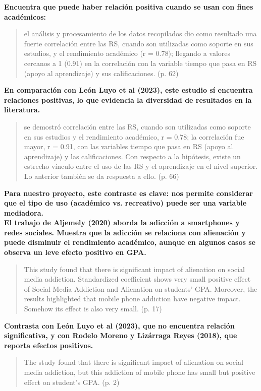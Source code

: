 \documentclass[12pt]{article}
\begin{document}
\textbf{Encuentra que puede haber relación positiva cuando se usan con fines académicos:}
\begin{quote}
     el análisis y procesamiento de los datos recopilados dio como resultado una fuerte 
    correlación entre las RS, cuando son utilizadas como soporte en sus estudios, y el rendimiento académico (r = 0.78); llegando 
    a valores cercanos a 1 (0.91) en la correlación con la variable tiempo que pasa en RS (apoyo al aprendizaje) y sus 
    calificaciones. (p. 62)
\end{quote}

\textbf{En comparación con León Luyo et al (2023), este estudio sí encuentra relaciones positivas, lo que evidencia la diversidad de resultados en la literatura.}
\begin{quote}
    se demostró correlación entre las RS, 
    cuando son utilizadas como soporte en sus estudios y el 
    rendimiento académico, r = 0.78; la correlación fue mayor, 
    r = 0.91, con las variables tiempo que pasa en RS (apoyo 
    al aprendizaje) y las calificaciones. Con respecto a la 
    hipótesis, existe un estrecho vínculo entre el uso de las RS 
    y el aprendizaje en el nivel superior. Lo anterior también 
    se da respuesta a ello. (p. 66)
\end{quote}
\textbf{Para nuestro proyecto, este contraste es clave: nos permite considerar que el tipo de uso (académico vs. recreativo) puede ser una variable mediadora.}\\

\textbf{El trabajo de Aljemely (2020) aborda la adicción a smartphones y redes sociales. Muestra que la adicción se relaciona con alienación y puede disminuir el rendimiento académico, aunque en algunos casos se observa un leve efecto positivo en GPA.}
\begin{quote}
    This study found that there is significant impact of alienation on social media addiction. Standardized  coefficient shows very small positive effect of Social Media Addiction and Alienation on students’ 
    GPA. Moreover, the results highlighted that mobile phone addiction have negative impact. Somehow 
    its effect is also very small. (p. 17) 
\end{quote}

\textbf{Contrasta con León Luyo et al (2023), que no encuentra relación significativa, y con Rodelo Moreno y Lizárraga Reyes (2018), que reporta efectos positivos. }
\begin{quote}
    The study found that there is significant impact of alienation on social 
    media addiction, but this addiction of mobile phone has small but positive effect on student’s GPA. (p. 2)
\end{quote}
\end{document}
